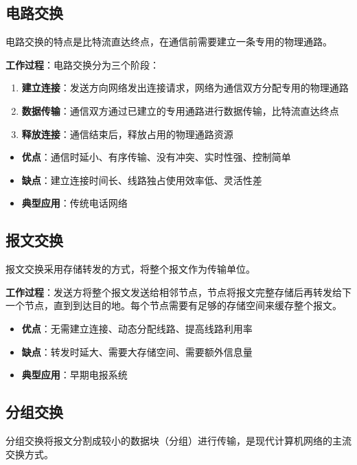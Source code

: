 \documentclass[12pt,a4paper,openany]{ctexbook}
\begin{document}
\subsection{电路交换}
电路交换的特点是比特流直达终点，在通信前需要建立一条专用的物理通路。

\textbf{工作过程}：电路交换分为三个阶段：
\begin{enumerate}[leftmargin=2em,itemsep=0pt]
    \item \textbf{建立连接}：发送方向网络发出连接请求，网络为通信双方分配专用的物理通路
    \item \textbf{数据传输}：通信双方通过已建立的专用通路进行数据传输，比特流直达终点
    \item \textbf{释放连接}：通信结束后，释放占用的物理通路资源
\end{enumerate}

\begin{itemize}[leftmargin=2em,itemsep=0pt]
    \item \textbf{优点}：通信时延小、有序传输、没有冲突、实时性强、控制简单
    \item \textbf{缺点}：建立连接时间长、线路独占使用效率低、灵活性差
    \item \textbf{典型应用}：传统电话网络
\end{itemize}

\subsection{报文交换}
报文交换采用存储转发的方式，将整个报文作为传输单位。

\textbf{工作过程}：发送方将整个报文发送给相邻节点，节点将报文完整存储后再转发给下一个节点，直到到达目的地。每个节点需要有足够的存储空间来缓存整个报文。

\begin{itemize}[leftmargin=2em,itemsep=0pt]
    \item \textbf{优点}：无需建立连接、动态分配线路、提高线路利用率
    \item \textbf{缺点}：转发时延大、需要大存储空间、需要额外信息量
    \item \textbf{典型应用}：早期电报系统
\end{itemize}

\subsection{分组交换}
分组交换将报文分割成较小的数据块（分组）进行传输，是现代计算机网络的主流交换方式。
\end{document}
